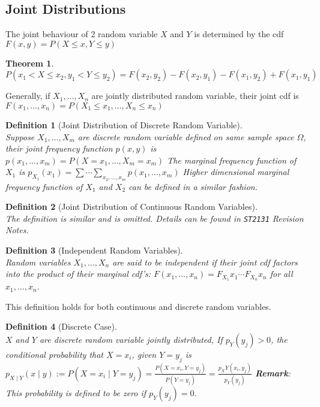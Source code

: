 \documentclass[12pt]{article}
\newtheorem{definition}{Definition}[section]
\newtheorem{theorem}{Theorem}[section]
\theoremstyle{definition}
\begin{document}
\subsection{Joint Distributions}
The joint behaviour of 2 random variable $X$ and $Y$ is determined by the cdf
$
F(x,y) = P(X\leq x, Y\leq y)
$
\begin{theorem}
$
P(x_1<X\leq x_2, y_1<Y\leq y_2) = F(x_2, y_2)-F(x_2, y_1)-F(x_1, y_2)+F(x_1, y_1)
$
\end{theorem}
Generally, if $X_1,\ldots, X_n$ are jointly distributed random variable, their joint cdf is
$
F(x_1, \ldots, x_n) = P(X_1\leq x_1, \ldots, X_n\leq x_n)
$
\begin{definition}[Joint Distribution of Discrete Random Variable]
\hfill\\\normalfont Suppose $X_1,\ldots, X_m$ are discrete random variable defined on same sample space $\Omega$, their joint frequency function $p(x,y)$ is
$
p(x_1, \ldots, x_m) = P(X=x_1,\ldots,  X_m=x_m)
$
The marginal frequency function of $X_1$ is
$
p_{X_1}(x_1) = \sum\cdots\sum_{x_2,\ldots,x_m} p(x_1, \ldots, x_m)
$
Higher dimensional marginal frequency function of $X_1$ and $X_2$ can be defined in a similar fashion.
\end{definition}
\begin{definition}[Joint Distribution of Continuous Random Variables]
\hfill\\\normalfont The definition is similar and is omitted. Details can be found in \texttt{ST2131} Revision Notes.
\end{definition}
\begin{definition}[Independent Random Variables]
\hfill\\\normalfont Random variables $X_1, \ldots, X_n$ are said to be independent if their joint cdf factors into the product of their marginal cdf's:
$
F(x_1, \ldots, x_n) = F_{X_1}{x_1}\cdots F_{X_n}{x_n}
$
for all $x_1,\ldots, x_n$.
\end{definition}
This definition holds for both continuous and discrete random variables.
\begin{definition}[Discrete Case]
\hfill\\\normalfont $X$ and $Y$ are discrete random variable jointly distributed, If $p_Y(y_j)>0$, the conditional probability that $X=x_i$, given 
 $Y=y_j$ is
 $
p_{X\mid Y}(x\mid y) := P(X=x_i\mid Y=y_j) = \frac{P(X=x_i, Y=y_j)}{P(Y=y_j)} = \frac{p_XY(x_i, y_j)}{p_Y(y_j)}
 $
\textbf{Remark}: This probability is defined to be zero if $p_Y(y_j) = 0$.\\
\end{definition}
\end{document}
